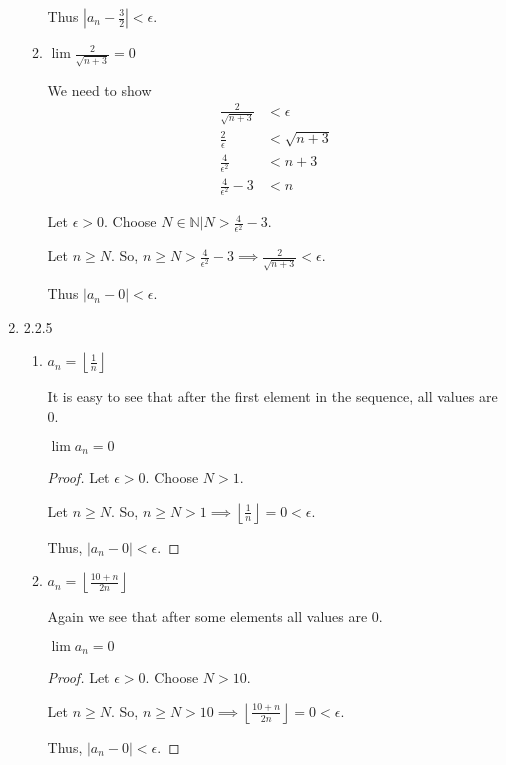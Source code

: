 \documentclass[12pt,letterpaper]{article}
\begin{document}
\begin{enumerate}
\begin{enumerate}
          Thus $|a_n - \frac{3}{2}| < \epsilon$.

        \item
          $\lim \frac{2}{\sqrt{n + 3}} = 0$

          We need to show
          \begin{align*}
            \frac{2}{\sqrt{n + 3}} &< \epsilon \\
            \frac{2}{\epsilon} &< \sqrt{n + 3} \\
            \frac{4}{\epsilon^2} &< n + 3 \\
            \frac{4}{\epsilon^2} - 3 &< n
          \end{align*}

          Let $\epsilon > 0$.
          Choose $N \in \mathbb{N} | N > \frac{4}{\epsilon^2} - 3$.

          Let $n \ge N$.
          So, $n \ge N > \frac{4}{\epsilon^2} - 3 \implies \frac{2}{\sqrt{n + 3}} < \epsilon$.

          Thus $|a_n - 0| < \epsilon$.
      \end{enumerate}

    \item 2.2.5
      \begin{enumerate}
        \item
          $a_n = \left\lfloor\frac{1}{n}\right\rfloor$

          It is easy to see that after the first element in the sequence,
          all values are $0$.

          $\lim a_n = 0$

          \begin{proof}
            Let $\epsilon > 0$.
            Choose $N > 1$.

            Let $n \ge N$.
            So, $n \ge N > 1 \implies \left\lfloor\frac{1}{n}\right\rfloor = 0 < \epsilon$.

            Thus, $|a_n - 0| < \epsilon$.
          \end{proof}

        \item
          $a_n = \left \lfloor \frac{10 + n}{2n} \right \rfloor$

          Again we see that after some elements all values are $0$.

          $\lim a_n = 0$

          \begin{proof}
            Let $\epsilon > 0$.
            Choose $N > 10$.

            Let $n \ge N$.
            So, $n \ge N > 10 \implies \left \lfloor \frac{10 + n}{2n} \right \rfloor = 0 < \epsilon$.

            Thus, $|a_n - 0| < \epsilon$.
          \end{proof}
      \end{enumerate}
  \end{enumerate}
\end{document}
